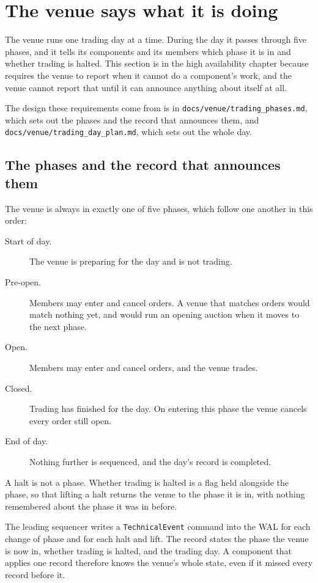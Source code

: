 \section{The venue says what it is doing}
\label{sec:ha:technical_event}

The venue runs one trading day at a time. During the day it passes through five phases, and it
tells its components and its members which phase it is in and whether trading is halted. This
section is in the high availability chapter because  requires the venue to report
when it cannot do a component's work, and the venue cannot report that until it can announce
anything about itself at all.

The design these requirements come from is in \texttt{docs/venue/trading\_phases.md}, which sets
out the phases and the record that announces them, and \texttt{docs/venue/trading\_day\_plan.md},
which sets out the whole day.

\subsection{The phases and the record that announces them}
\label{sec:ha:technical_event:phases}

The venue is always in exactly one of five phases, which follow one another in this order:

\begin{description}
  \item[Start of day.] The venue is preparing for the day and is not trading.
  \item[Pre-open.] Members may enter and cancel orders. A venue that matches orders would match
    nothing yet, and would run an opening auction when it moves to the next phase.
  \item[Open.] Members may enter and cancel orders, and the venue trades.
  \item[Closed.] Trading has finished for the day. On entering this phase the venue cancels every
    order still open.
  \item[End of day.] Nothing further is sequenced, and the day's record is completed.
\end{description}

A halt is not a phase. Whether trading is halted is a flag held alongside the phase, so that
lifting a halt returns the venue to the phase it is in, with nothing remembered about the phase it
was in before.

The leading sequencer writes a \texttt{TechnicalEvent} command into the WAL for each change of
phase and for each halt and lift. The record states the phase the venue is now in, whether trading
is halted, and the trading day. A component that applies one record therefore knows the venue's
whole state, even if it missed every record before it.

